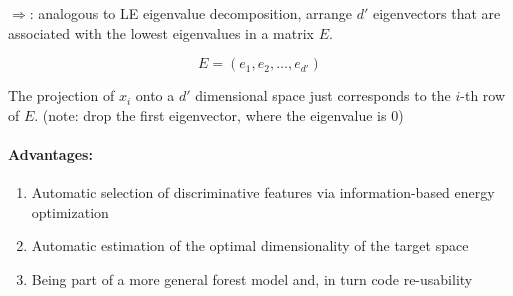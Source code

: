 \bigbreak
\(\Rightarrow\): analogous to LE eigenvalue decomposition, arrange \(d'\) eigenvectors that are associated with the lowest eigenvalues in a matrix $E$.

\[E = (e_1, e_2, \dots, e_{d'})\]

The projection of \(x_i\) onto a \(d'\) dimensional space just corresponds to the \(i\)-th row of \(E\). (note: drop the first eigenvector, where the eigenvalue is 0)

\paragraph{Advantages:}
\begin{enumerate}
  \item Automatic selection of discriminative features via information-based energy optimization
  \item Automatic estimation of the optimal dimensionality of the target space
  \item Being part of a more general forest model and, in turn code re-usability
\end{enumerate}
